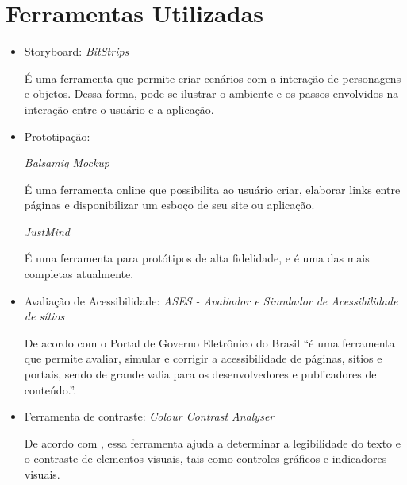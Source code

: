 \chapter[Ferramentas]{Ferramentas Utilizadas}

\begin{itemize}
  \item Storyboard: \textit{BitStrips}
  
  \subitem É uma ferramenta que permite criar cenários com a interação de personagens e objetos. Dessa forma, pode-se ilustrar o ambiente e os passos envolvidos na interação entre o usuário e a aplicação.
  
  \item Prototipação: 
  
  \subitem \textit{Balsamiq Mockup}
  
  \subsubitem É uma ferramenta online que possibilita ao usuário criar, elaborar links entre páginas e disponibilizar um esboço de seu site ou aplicação.
  
  \subitem \textit{JustMind}
  
  \subsubitem É uma ferramenta para protótipos de alta fidelidade, e é uma das mais completas atualmente. 
  
  \item Avaliação de Acessibilidade: \textit{ASES - Avaliador e Simulador de Acessibilidade de sítios}
  
  \subitem De acordo com o Portal de Governo Eletrônico	do Brasil “é uma ferramenta que permite avaliar, simular e corrigir a acessibilidade de páginas, sítios e 
  portais, sendo de grande valia para os desenvolvedores e publicadores de conteúdo.”. \cite{brasil} 
  
  \item Ferramenta de contraste: \textit{Colour Contrast Analyser}
  
  \subitem De acordo com , essa ferramenta ajuda a determinar a legibilidade do texto e o 
  contraste de elementos visuais, tais como controles gráficos e indicadores visuais.
\end{itemize}

